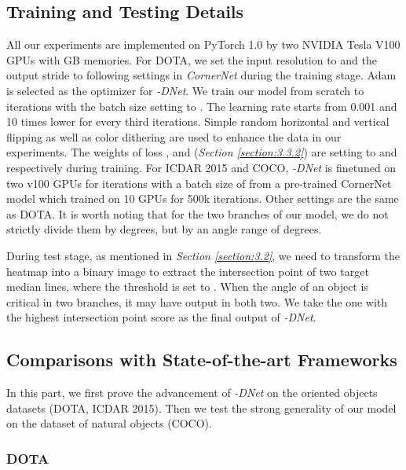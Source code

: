 \documentclass[runningheads]{llncs}
\begin{document}
\subsection{Training and Testing Details}

All our experiments are implemented on PyTorch 1.0\cite{paszke2017automatic} by two NVIDIA Tesla V100 GPUs with  GB memories. For DOTA, we set the input resolution  to  and the output stride to  following settings in \textit{CornerNet}\cite{law2018cornernet} during the training stage. Adam\cite{kingma2014adam} is selected as the optimizer for \textit{\textit{-DNet}}. We train our model from scratch to  iterations with the batch size setting to . The learning rate starts from 0.001 and 10 times lower for every third iterations. Simple random horizontal and vertical flipping as well as color dithering are used to enhance the data in our experiments. The weights of loss ,  and  ({\color{red}\textit{Section \ref{section:3.3.2}}}) are setting to  and  respectively during training.  For ICDAR 2015 and COCO, \textit{\textit{-DNet}} is finetuned on two v100 GPUs for  iterations with a batch size of  from a pre-trained CornerNet model which trained on 10 GPUs for 500k iterations. Other settings are the same as DOTA. It is worth noting that for the two branches of our model, we do not strictly divide them by  degrees, but by an angle range of  degrees.

During test stage, as mentioned in {\color{red}\textit{Section \ref{section:3.2}}}, we need to transform the heatmap into a binary image to extract the intersection point of two target median lines, where the threshold is set to . When the angle of an object is critical in two branches, it may have output in both two. We take the one with the highest intersection point score as the final output of \textit{\textit{-DNet}}.



\subsection{Comparisons with State-of-the-art Frameworks}

In this part, we first prove the advancement of \textit{\textit{-DNet}} on the oriented objects datasets (DOTA, ICDAR 2015). Then we test the strong generality of our model on the  dataset of natural objects (COCO).

\subsubsection{DOTA}
\end{document}
